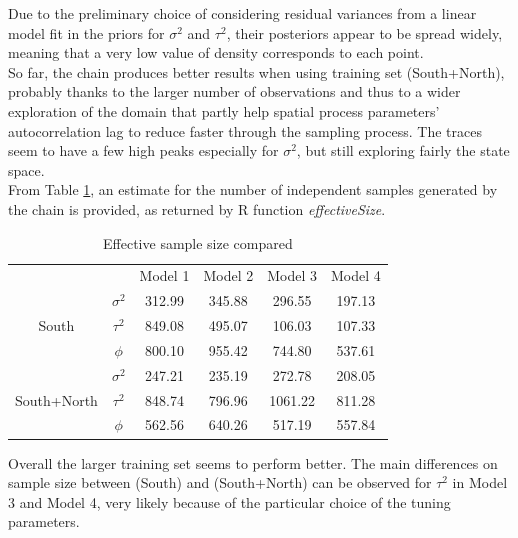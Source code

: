 \documentclass[12pt]{article}
\begin{document}
	\noindent
	Due to the preliminary choice of considering residual variances from a linear model fit in the priors for $\sigma^2$ and $\tau^2$, their posteriors appear to be spread widely, meaning that a very low value of density corresponds to each point.\\
	
	\noindent
	So far, the chain produces better results when using training set (South+North), probably thanks to the larger number of observations and thus to a wider exploration of the domain that partly help spatial process parameters'
	autocorrelation lag to reduce faster through the sampling process. The traces seem to have a few high peaks especially for $\sigma^2$, but still exploring fairly the state space.\\
	
	\noindent
	From Table \ref{effsize}, an estimate for the number of independent samples generated by the chain is provided, as returned by R function \emph{effectiveSize}.
	\renewcommand{\baselinestretch}{1.5}
	\begin{table}[H]
		\centering
		\begin{tabular}{cccccc}
			&& Model 1 & Model 2 & Model 3 & Model 4 \\ \cline{2-6}
			\multicolumn{1}{c|}{\multirow{3}{*}{South}} & \multicolumn{1}{c|}{ $\sigma^2$} & 312.99 & 345.88 & 296.55 & \multicolumn{1}{c|}{197.13} \\
			\multicolumn{1}{c|}{} & \multicolumn{1}{c|}{$\tau^2$} & 849.08 & 495.07 & 106.03 & \multicolumn{1}{c|}{107.33} \\
			\multicolumn{1}{c|}{} & \multicolumn{1}{c|}{$\phi$} & 800.10 & 955.42 & 744.80 & \multicolumn{1}{c|}{537.61}\\
			\cline{2-6}
			\multicolumn{1}{c|}{\multirow{3}{*}{South+North}} & \multicolumn{1}{c|}{$\sigma^2$} & 247.21 & 235.19 & 272.78 & \multicolumn{1}{c|}{208.05} \\
			\multicolumn{1}{c|}{} & \multicolumn{1}{c|}{$\tau^2$} & 848.74 & 796.96 & 1061.22 & \multicolumn{1}{c|}{811.28} \\
			\multicolumn{1}{c|}{} & \multicolumn{1}{c|}{$\phi$} & 562.56 & 640.26 & 517.19 & \multicolumn{1}{c|}{557.84} \\
			\cline{2-6}
		\end{tabular}
		\caption{Effective sample size compared}\label{effsize}
	\end{table}
	\renewcommand{\baselinestretch}{1}
	
	\noindent
	Overall the larger training set seems to perform better. The main differences on sample size between (South) and (South+North) can be observed for $\tau^2$ in Model 3 and Model 4, very likely because of the particular choice of the tuning parameters.\\
\end{document}
